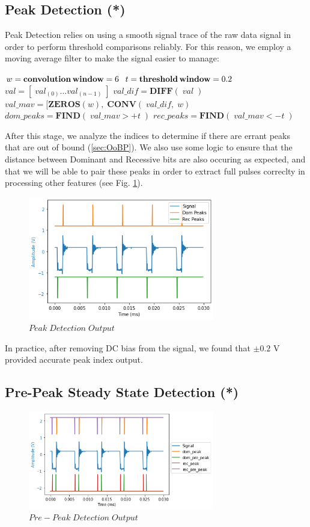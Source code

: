 \documentclass[conference]{IEEEtran}
\begin{document}
\subsection{Peak Detection (*)}
Peak Detection relies on using a smooth signal trace of the raw data signal in order to perform threshold comparisons reliably. For this reason, we employ a moving average filter to make the signal easier to manage:
\medbreak
\begin{algorithmic}
\STATE $w = \textbf{convolution\,window} = 6$
\STATE $t = \textbf{threshold\,window} = 0.2$
\STATE $val = [\;val_{(0)} ... val_{(n-1)}\;] $
\STATE $val\_dif = \textbf{DIFF}(\;val\;) $
\STATE $val\_mav = [\textbf{ZEROS}(w),\;\textbf{CONV}(\;val\_dif,\;w) $
\STATE $dom\_peaks = \textbf{FIND}(\;val\_mav > +t\;)$
\STATE $rec\_peaks = \textbf{FIND}(\;val\_mav < -t\;)$
\end{algorithmic}
\medbreak

After this stage, we analyze the indices to determine if there are errant peaks that are out of bound (\ref{sec:OoBP}). We also use some logic to ensure that the distance between Dominant and Recessive bits are also occuring as expected, and that we will be able to pair these peaks in order to extract full pulses correclty in processing other features (see Fig. \ref{fig:Peak}).

\begin{figure}[htb]
\centering
\includegraphics[width=3.2in]{figures/50_peak.png}
\caption{$Peak\;Detection\;Output$}
\label{fig:Peak}
\end{figure}

In practice, after removing DC bias from the signal, we found that $\pm 0.2$ V provided accurate peak index output.

\subsection{Pre-Peak Steady State Detection (*)}
\begin{figure}[htb]
\centering
\includegraphics[width=3.2in]{figures/51_prepeak.png}
\caption{$Pre-Peak\;Detection\;Output$}
\label{fig:Prepeak}
\end{figure}
\end{document}
